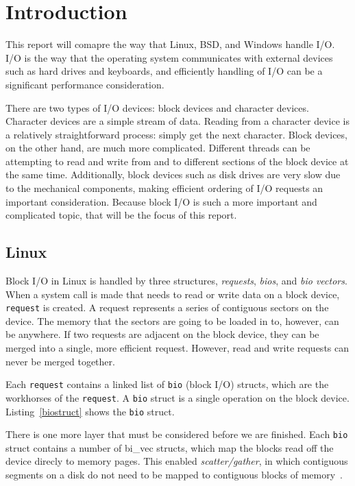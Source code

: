 \documentclass[10pt,journal,draftclsnofoot,onecolumn]{IEEEtran}
\begin{document}
\section{Introduction}
This report will comapre the way that Linux, BSD, and
Windows handle I/O. I/O is the way that the operating system
communicates with external devices such as hard drives and keyboards,
and efficiently handling of I/O can be a significant performance
consideration.

There are two types of I/O devices: block devices and character devices.
Character devices are a simple stream of data. Reading from a character
device is a relatively straightforward process: simply get the next character.
Block devices, on the other
hand, are much more complicated. Different threads can be attempting to read
and write from and to different sections of the block device at the same time.
Additionally, block devices such as disk drives are very slow due to the
mechanical components, making efficient ordering of I/O requests an important
consideration. Because block I/O is such a more important and
complicated topic, that will be the focus of this report.
%
\subsection{Linux}
Block I/O in Linux is handled by three structures, \textit{requests},
\textit{bios}, and \textit{bio vectors}. When a system call is made that
needs to read or write data on a block device,
\texttt{request} is created. A request
represents a series of contiguous sectors
on the device. The memory that the sectors are going to be loaded in to,
however, can be anywhere. If two requests are adjacent on the block device,
they can be merged into a single, more efficient request. However, read
and write requests can never be merged together.

Each \texttt{request} contains a linked list of \texttt{bio} (block I/O) structs, which
are the workhorses of the \texttt{request}. A \texttt{bio} struct is a single
operation on the block device. Listing~\ref{biostruct} shows the
\texttt{bio} struct.

There is one more layer that must be considered before we are finished. Each
\texttt{bio} struct contains a number of {bi\_vec} structs, which map
the blocks read off the device direcly to memory pages. This enabled
\textit{scatter/gather}, in which contiguous segments on a disk do not need
to be mapped to contiguous blocks of memory~\cite{ldd3}.
\end{document}
